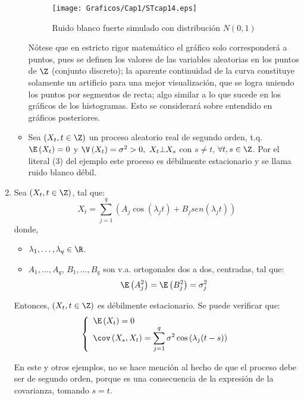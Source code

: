\begin{ejemplo}
\begin{enumerate}
\begin{itemize}
\begin{figure}[H]
\centering
\texttt{[image: Graficos/Cap1/STcap14.eps]}
\caption{Ruido blanco fuerte simulado con distribuci\'{o}n $N(0,1)$}
\end{figure}

\begin{observacion}
N\'{o}tese que en estricto rigor matem\'{a}tico el gr\'{a}fico solo corresponder\'{a} a puntos, pues se definen los valores de las variables aleatorias en los puntos de $\Z$ (conjunto discreto); la aparente continuidad de la curva constituye solamente un artificio para una mejor visualizaci\'{o}n, que se logra uniendo los puntos por segmentos de recta; algo similar a lo que sucede en los gr\'{a}ficos de los histogramas. Esto se considerar\'{a} sobre entendido en gr\'{a}ficos posteriores.
\end{observacion}

\item Sea $(X_{t}, t\in \Z)$ un proceso aleatorio real de segundo orden, t.q. $\E\left( X_{t} \right)=0$ y $\V\left( X_{t} \right)=\sigma^{2}>0,\ X_{t}\bot X_{s}$ con $s\neq t$, $\forall t, s\in \Z$. Por el literal (3) del ejemplo este proceso es d\'{e}bilmente estacionario y se llama ruido blanco d\'{e}bil.
\end{itemize}

\item Sea $(X_{t}, t\in \Z)$, tal que: 
	\[
		X_{t}=\sum_{j=1}^q \left( A_{j}\cos \left( \lambda_{j}t \right)+B_{j}sen\left( \lambda_{j}t \right) \right) 
	\]
donde,
\begin{itemize}
	\item $\lambda_{1},\dots,\lambda_{q}\in \R$.
	\item $A_{1},\dots,A_{q}$, $B_{1},\dots,B_{q}$ son v.a. ortogonales dos a dos, centradas, tal que:
	\[
	\E\left( A_{j}^{2} \right)=\E\left( B_{j}^{2} \right)=\sigma_{j}^{2}
	\]
\end{itemize}
Entonces, $(X_{t}, t\in \Z)$ es d\'{e}bilmente estacionario. Se puede verificar que:
\[
	\left\{ {\begin{array}{l}
	\E\left( X_{t} \right)=0\\ 
	\cov\left( X_{s},X_{t} \right)=\displaystyle\sum_{j=1}^q {\sigma^{2}\cos\left( \lambda_{j}(t-s) \right)} \\ 
	\end{array}} \right.
\]
	
En este y otros ejemplos, no se hace menci\'{o}n al hecho de que el proceso debe ser de segundo orden, porque es una consecuencia de la expresi\'{o}n de la covarianza, tomando $s=t$.


\end{enumerate}
\end{ejemplo}
